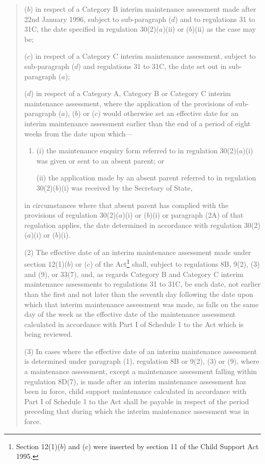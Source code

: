 \documentclass[12pt,a4paper]{article}
\begin{document}
\begin{quotation}
\begin{enumerate}
($b$) in respect of a Category B interim maintenance assessment made after 22nd January 1996, subject to sub-paragraph ($d$) and to regulations 31 to 31C, the date specified in regulation 30(2)($a$)(ii) or ($b$)(ii) as the case may be;

($c$) in respect of a Category C interim maintenance assessment, subject to sub-paragraph ($d$) and regulations 31 to 31C, the date set out in sub-paragraph ($a$);

($d$) in respect of a Category A, Category B or Category C interim maintenance assessment, where the application of the provisions of sub-paragraph ($a$), ($b$) or ($c$) would otherwise set an effective date for an interim maintenance assessment earlier than the end of a period of eight weeks from the date upon which—
\begin{enumerate}\item[]
(i) the maintenance enquiry form referred to in regulation 30(2)($a$)(i) was given or sent to an absent parent; or

(ii) the application made by an absent parent referred to in regulation 30(2)($b$)(i) was received by the Secretary of State,
\end{enumerate}
in circumstances where that absent parent has complied with the provisions of regulation 30(2)($a$)(i) or ($b$)(i) or paragraph (2A) of that regulation applies, the date determined in accordance with regulation 30(2)($a$)(i) or ($b$)(i).
\end{enumerate}

(2) The effective date of an interim maintenance assessment made under section 12(1)($b$) or ($c$) of the Act\footnote{\frenchspacing Section 12(1)($b$) and ($c$) were inserted by section 11 of the Child Support Act 1995.} shall, subject to regulations 8B, 9(2), (3) and (9), or 33(7), and, as regards Category B and Category C interim maintenance assessments to regulations 31 to 31C, be such date, not earlier than the first and not later than the seventh day following the date upon which that interim maintenance assessment was made, as falls on the same day of the week as the effective date of the maintenance assessment calculated in accordance with Part I of Schedule 1 to the Act which is being reviewed.

(3) In cases where the effective date of an interim maintenance assessment is determined under paragraph (1), regulation 8B or 9(2), (3) or (9), where a maintenance assessment, except a maintenance assessment falling within regulation 8D(7), is made after an interim maintenance assessment has been in force, child support maintenance calculated in accordance with Part I of Schedule 1 to the Act shall be payable in respect of the period preceding that during which the interim maintenance assessment was in force.


\end{quotation}
\end{document}
